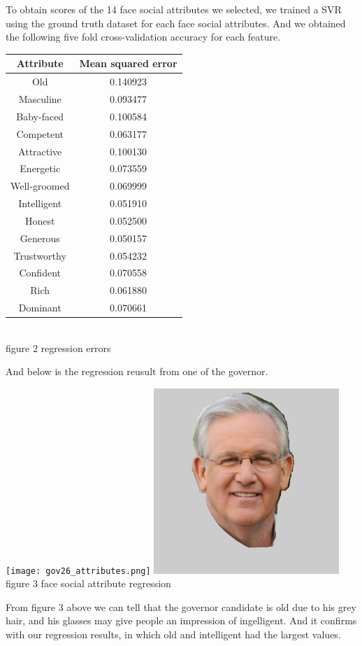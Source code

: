 \documentclass[12pt]{article}
\newenvironment{p3}[2][IV Scoring Face Social Attributes with SVR]{\begin{trivlist}
\item[\hskip \labelsep {\bfseries #1}\hskip \labelsep {\bfseries #2}]}{\end{trivlist}}
\begin{document}
\begin{p3}{}
\item{}
To obtain scores of the 14 face social attributes we selected, we trained a SVR using the ground truth dataset for each face social attributes. And we obtained the following five fold cross-validation accuracy for each feature.\\
\begin{center}
	\begin{tabular}{||c c||} 
		\hline
	    Attribute  & Mean squared error \\
		\hline
		Old & 0.140923\\
		\hline
		Masculine & 0.093477\\
		\hline
		Baby-faced & 0.100584\\
		\hline
		Competent & 0.063177\\
		\hline
		Attractive & 0.100130\\
		\hline
		Energetic & 0.073559\\
		\hline
		Well-groomed & 0.069999\\
		\hline
		Intelligent & 0.051910\\
		\hline
		Honest & 0.052500\\
		\hline
		Generous & 0.050157\\
		\hline
		Trustworthy & 0.054232\\
		\hline
		Confident & 0.070558\\
		\hline
		Rich & 0.061880\\
		\hline
		Dominant & 0.070661\\
		\hline
	\end{tabular}
	{\\figure 2 regression errors}
\end{center}
And below is the regression reusult from one of the governor.\\
\begin{center}
		\texttt{[image: gov26\_attributes.png]}
		\includegraphics[height=7cm]{img-elec/governor/G0026.jpg}
		figure 3 face social attribute regression	
\end{center}
From figure 3 above we can tell that the governor candidate is old due to his grey hair, and his glasses may give people an impression of ingelligent. And it confirms with our regression results, in which old and intelligent had the largest values.
\item{}
\end{p3}

 
\end{document}
